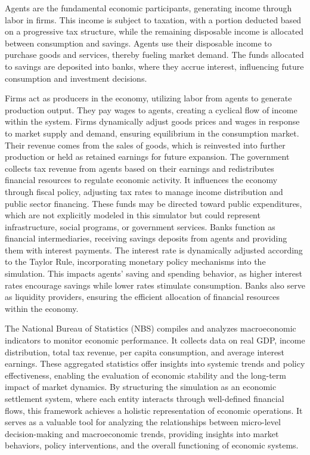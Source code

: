 Agents are the fundamental economic participants, generating income through labor in firms. This income is subject to taxation, with a portion deducted based on a progressive tax structure, while the remaining disposable income is allocated between consumption and savings. Agents use their disposable income to purchase goods and services, thereby fueling market demand. The funds allocated to savings are deposited into banks, where they accrue interest, influencing future consumption and investment decisions.

Firms act as producers in the economy, utilizing labor from agents to generate production output. They pay wages to agents, creating a cyclical flow of income within the system. Firms dynamically adjust goods prices and wages in response to market supply and demand, ensuring equilibrium in the consumption market. Their revenue comes from the sales of goods, which is reinvested into further production or held as retained earnings for future expansion. The government collects tax revenue from agents based on their earnings and redistributes financial resources to regulate economic activity. It influences the economy through fiscal policy, adjusting tax rates to manage income distribution and public sector financing. These funds may be directed toward public expenditures, which are not explicitly modeled in this simulator but could represent infrastructure, social programs, or government services. Banks function as financial intermediaries, receiving savings deposits from agents and providing them with interest payments. The interest rate is dynamically adjusted according to the Taylor Rule, incorporating monetary policy mechanisms into the simulation. This impacts agents’ saving and spending behavior, as higher interest rates encourage savings while lower rates stimulate consumption. Banks also serve as liquidity providers, ensuring the efficient allocation of financial resources within the economy.

The National Bureau of Statistics (NBS) compiles and analyzes macroeconomic indicators to monitor economic performance. It collects data on real GDP, income distribution, total tax revenue, per capita consumption, and average interest earnings. These aggregated statistics offer insights into systemic trends and policy effectiveness, enabling the evaluation of economic stability and the long-term impact of market dynamics. By structuring the simulation as an economic settlement system, where each entity interacts through well-defined financial flows, this framework achieves a holistic representation of economic operations. It serves as a valuable tool for analyzing the relationships between micro-level decision-making and macroeconomic trends, providing insights into market behaviors, policy interventions, and the overall functioning of economic systems.

